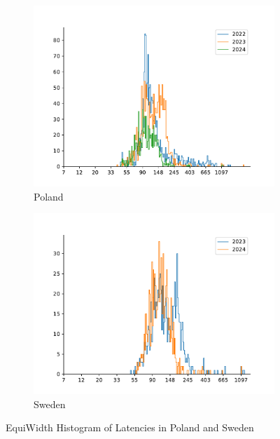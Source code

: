 \begin{figure}
	\centering
	\begin{subfigure}[b]{0.8\linewidth}
		\includegraphics[width=\linewidth]{chapters/4-results/latency/img/histogram_of_latencies_of_starlink_probes_in_poland.pdf}
		\caption{Poland}
	\end{subfigure}
	\begin{subfigure}[b]{0.8\linewidth}
		\includegraphics[width=\linewidth]{chapters/4-results/latency/img/histogram_of_latencies_of_starlink_probes_in_sweden.pdf}
		\caption{Sweden}
	\end{subfigure}
	\caption{EquiWidth Histogram of Latencies in Poland and Sweden}
	\label{fig:latency-histogram-5}
\end{figure}


